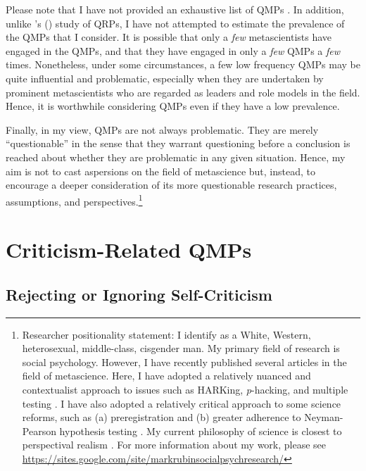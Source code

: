 \documentclass[authordate, meta, issue]{jote-new-article}
\begin{document}
Please note that I have not provided an exhaustive list of QMPs \parencites[for some additional QMPs, please see][p. 2]{Devezer2021}. In addition, unlike \citeauthor{John2012}'s \mbox{(\hspace*{-.21em}\citeyear{John2012})} study of QRPs, I have not attempted to estimate the prevalence of the QMPs that I consider. It is possible that only a \emph{few} metascientists have engaged in the QMPs, and that they have engaged in only a \emph{few} QMPs a \emph{few} times. Nonetheless, under some circumstances, a few low frequency QMPs may be quite influential and problematic, especially when they are undertaken by prominent metascientists who are regarded as leaders and role models in the field. Hence, it is worthwhile considering QMPs even if they have a low prevalence.



Finally, in my view, QMPs are not always problematic. They are merely “questionable” in the sense that they warrant questioning before a conclusion is reached about whether they are problematic in any given situation. Hence, my aim is not to cast aspersions on the field of metascience but, instead, to encourage a deeper consideration of its more questionable research practices, assumptions, and perspectives.\footnote{Researcher positionality statement: I identify as a White, Western, heterosexual, middle-class, cisgender man. My primary field of research is social psychology. However, I have recently published several articles in the field of metascience. Here, I have adopted a relatively nuanced and contextualist approach to issues such as HARKing, \emph{p}-hacking, and multiple testing \parencites[e.g.,][]{Rubin2017a}{Rubin2017b}{Rubin2021b}{Rubin2022}. I have also adopted a relatively critical approach to some science reforms, such as (a) preregistration \parencites[e.g.,][]{Rubin2020}{Rubin2022} and (b) greater adherence to Neyman-Pearson hypothesis testing \parencites[e.g.,][]{Rubin2021a}. My current philosophy of science is closest to perspectival realism \parencites{Crețu2019}{Giere2006}{Massimi2022}. For more information about my work, please see \url{https://sites.google.com/site/markrubinsocialpsychresearch/}}



\section{Criticism-Related QMPs}



\subsection{Rejecting or Ignoring Self-Criticism}
\end{document}
